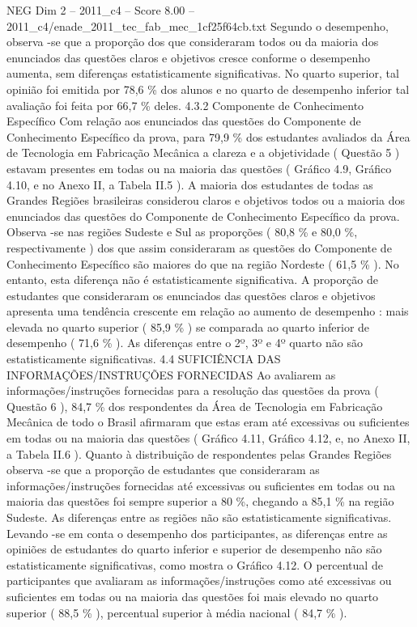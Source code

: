 \begin{textsample}{NEG Dim 2 – 2011\_c4 – Score 8.00 – 2011\_c4/enade\_2011\_tec\_fab\_mec\_1cf25f64cb.txt}
Segundo o desempenho, observa -se que a proporção dos que consideraram todos ou da maioria dos enunciados das questões claros e objetivos cresce conforme o desempenho aumenta, sem diferenças estatisticamente significativas.
No quarto superior, tal opinião foi emitida por 78,6 \% dos alunos e no quarto de desempenho inferior tal avaliação foi feita por 66,7 \% deles. 4.3.2 Componente de Conhecimento Específico Com relação aos enunciados das questões do Componente de Conhecimento Específico da prova, para 79,9 \% dos estudantes avaliados da Área de Tecnologia em Fabricação Mecânica a clareza e a objetividade ( Questão 5 ) estavam presentes em todas ou na maioria das questões ( Gráfico 4.9, Gráfico 4.10, e no Anexo II, a Tabela II.5 ).
A maioria dos estudantes de todas as Grandes Regiões brasileiras considerou claros e objetivos todos ou a maioria dos enunciados das questões do Componente de Conhecimento Específico da prova.
Observa -se nas regiões Sudeste e Sul as proporções ( 80,8 \% e 80,0 \%, respectivamente ) dos que assim consideraram as questões do Componente de Conhecimento Específico são maiores do que na região Nordeste ( 61,5 \% ).
No entanto, esta diferença não é estatisticamente significativa.
A proporção de estudantes que consideraram os enunciados das questões claros e objetivos apresenta uma tendência crescente em relação ao aumento de desempenho : mais elevada no quarto superior ( 85,9 \% ) se comparada ao quarto inferior de desempenho ( 71,6 \% ).
As diferenças entre o 2º, 3º e 4º quarto não são estatisticamente significativas. 4.4 SUFICIÊNCIA DAS INFORMAÇÕES/INSTRUÇÕES FORNECIDAS Ao avaliarem as informações/instruções fornecidas para a resolução das questões da prova ( Questão 6 ), 84,7 \% dos respondentes da Área de Tecnologia em Fabricação Mecânica de todo o Brasil afirmaram que estas eram até excessivas ou suficientes em todas ou na maioria das questões ( Gráfico 4.11, Gráfico 4.12, e, no Anexo II, a Tabela II.6 ).
Quanto à distribuição de respondentes pelas Grandes Regiões observa -se que a proporção de estudantes que consideraram as informações/instruções fornecidas até excessivas ou suficientes em todas ou na maioria das questões foi sempre superior a 80 \%, chegando a 85,1 \% na região Sudeste.
As diferenças entre as regiões não são estatisticamente significativas.
Levando -se em conta o desempenho dos participantes, as diferenças entre as opiniões de estudantes do quarto inferior e superior de desempenho não são estatisticamente significativas, como mostra o Gráfico 4.12.
O percentual de participantes que avaliaram as informações/instruções como até excessivas ou suficientes em todas ou na maioria das questões foi mais elevado no quarto superior ( 88,5 \% ), percentual superior à média nacional ( 84,7 \% ).

\end{textsample}
